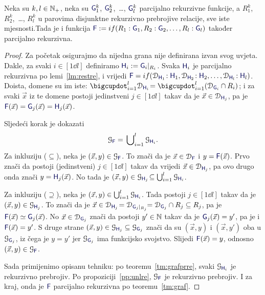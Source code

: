 \begin{teorem}\label{tm:gre}
Neka su $k,l\in{\mathbb N}_+$, neka su $\f G_1^k$, $\f G_2^k$,~\ldots, $\f G_l^k$ parcijalno rekurzivne funkcije, a $R_1^k$, $R_2^k$,~\ldots, $R_l^k$ u parovima disjunktne rekurzivno prebrojive relacije, sve iste mjesnosti.\newline Tada je i funkcija $\f F:=\IF{R_1:\f G_1,R_2:\f G_2,\dots,R_l:\f G_l}$ također parcijalno rekurzivna.
\end{teorem}
\begin{proof}
Za početak osigurajmo da nijedna grana nije definirana izvan svog uvjeta. Dakle, za svaki $i\in[1\dd l]$ definiramo $\f H_i:=\f G_i|_{R_i}$. Svaka $\f H_i$ je parcijalno rekurzivna po lemi~\ref{lm:restre}, i vrijedi $\f F=\IF{\dom{\f H_1}\!:\f H_1,\dom{\f H_2}\!:\f H_2,\dots,\dom{\f H_l}\!:\f H_l}$. Doista, domene su im iste: $\bdcup_{i=1}^l\dom{\f H_i}\!=\bdcup_{i=1}^l(\dom{\f G_i}\cap R_i)$; i za svaki $\vec x$ iz te domene postoji jedinstveni $j\in[1\dd l]$ takav da je $\vec x\in\dom{\f H_{j}}$, pa je $\f F(\vec x)=\f G_{j}(\vec x)=\f H_{j}(\vec x)$.

Sljedeći korak je dokazati
\begin{equation}
    \graf{\f F}=\,\bigcup\nolimits_{i=1}^l\graf{\f H_i}\text.
\end{equation}
Za inkluziju ($\subseteq$), neka je $(\vec x,y)\in\graf{\f F}$. To znači da je $\vec x\in\dom{\f F}$ i $y=\f F(\vec x)$. Prvo znači da postoji (jedinstveni) $j\in[1\dd l]$ takav da vrijedi $\vec x\in\dom{\f H_{j}}$, pa ovo drugo onda znači $y=\f H_{j}(\vec x)$. No tada je $(\vec x,y)\in\graf{\f H_{j}}\!\subseteq\bigcup_{i=1}^l\graf{\f H_i}$.

Za inkluziju ($\supseteq$), neka je $(\vec x,y)\in\bigcup_{i=1}^l\graf{\f H_i}$. Tada postoji $j\in[1\dd l]$ takav da je $(\vec x,y)\in\graf{\f H_j}$. To znači da je $\vec x\in\dom{\f H_j}\!=\dom{\f G_j|_{R_j}}\!\!=\dom{\f G_j}\cap R_j\subseteq R_j$, pa je $\f F(\vec x)\simeq\f G_j(\vec x)$. No $\vec x\in\dom{\f G_j}$ znači da postoji $y'\in{\mathbb N}$ takav da je $\f G_j(\vec x)=y'$, pa je i $\f F(\vec x)=y'$. S druge strane $(\vec x,y)\in\graf{\f H_j}\subseteq\graf{\f G_j}$ znači da su $(\vec x,y)$ i $(\vec x,y')$ oba u $\graf{\f G_j}$, iz čega je $y=y'$ jer $\graf{\f G_j}$ ima funkcijsko svojstvo. Slijedi $\f F(\vec x)=y$, odnosno $(\vec x,y)\in\graf{\f F}$.

Sada primijenimo opisanu tehniku: po teoremu~\ref{tm:grafprre}, svaki $\graf{\f H_i}$ je rekurzivno prebrojiv. Po propoziciji~\ref{pp:unlre}, $\graf{\f F}$ je rekurzivno prebrojiv. I za kraj, onda je $\f F$ parcijalno rekurzivna po teoremu~\ref{tm:graf}.
\end{proof}

